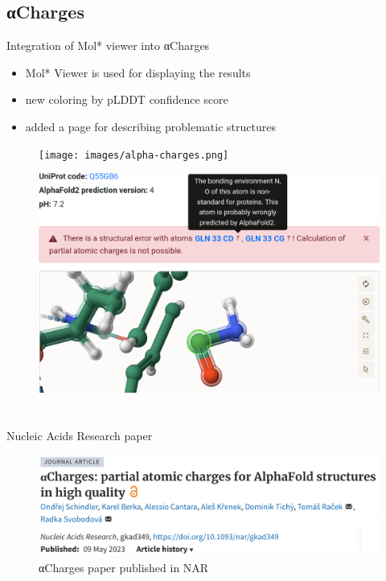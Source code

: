 \documentclass[
]{beamer}
\begin{document}
\subsection[αCharges]{αCharges}

\begin{frame}{Integration of Mol* viewer into αCharges}
  \begin{itemize}
    \item Mol* Viewer is used for displaying the results
    \item new coloring by pLDDT confidence score
    \item added a page for describing problematic structures
  \end{itemize}
\end{frame}


\begin{frame}
  \begin{figure}
    \texttt{[image: images/alpha-charges.png]}
  \end{figure}
  \end{frame}

\begin{frame}
  \begin{figure}
    \includegraphics[width=1\textwidth,height=\textheight,keepaspectratio]{images/focus.png}
  \end{figure}
  \end{frame}

\section[]{}

\begin{frame}{Nucleic Acids Research paper}
\begin{figure}
  \includegraphics[width=1\textwidth,keepaspectratio]{images/paper.png}
  \caption{αCharges paper published in NAR \cite{schindler2023acharges}}
\end{figure}
\end{frame}
\end{document}
